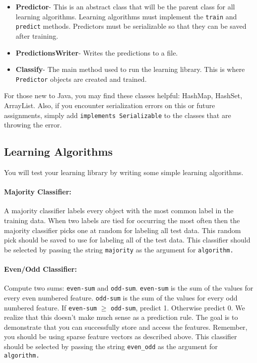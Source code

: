 \documentclass[11pt]{article}
\begin{document}
\begin{itemize}
\item {\bf Predictor}- This is an abstract class that will be the parent class for all learning algorithms. Learning algorithms must implement the {\tt train} and {\tt predict} methods. Predictors must be serializable so that they can be saved after training.

\item {\bf PredictionsWriter}- Writes the predictions to a file.

\item {\bf Classify}- The main method used to run the learning library. This is where {\tt Predictor} objects are created and trained.

\end{itemize}

For those new to Java, you may find these classes helpful: HashMap, HashSet, ArrayList. Also, if you encounter serialization errors on this or future assignments, simply add {\tt implements Serializable} to the classes that are throwing the error.

\subsection{Learning Algorithms}
You will test your learning library by writing some simple learning algorithms.
\paragraph{Majority Classifier:} A majority classifier labels every object with the most common label in the training data. When two labels are tied for occurring the most often then the majority classifier picks one at random for labeling all test data. This random pick should be saved to use for labeling all of the test data. This classifier should be selected by passing the string {\tt majority} as the argument for {\tt algorithm.}

\paragraph{Even/Odd Classifier:} Compute two sums: {\tt even-sum} and {\tt odd-sum}. {\tt even-sum} is the sum of the values for every even numbered feature. {\tt odd-sum} is the sum of the values for every odd numbered feature. If {\tt even-sum} $\ge$ {\tt odd-sum}, predict 1. Otherwise predict 0. We realize that this doesn't make much sense as a prediction rule. The goal is to demonstrate that you can successfully store and access the features. Remember, you should be using sparse feature vectors as described above. This classifier should be selected by passing the string {\tt even\_odd} as the argument for {\tt algorithm.}
\end{document}
